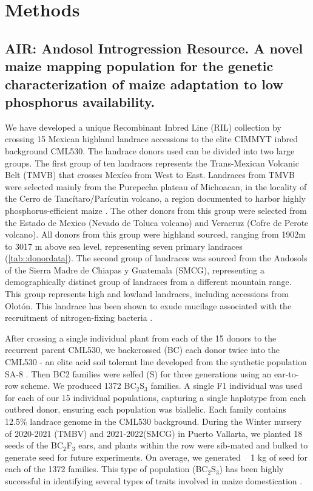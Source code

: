 \section{Methods}

\subsection{AIR: Andosol Introgression Resource. A novel maize mapping population for the genetic characterization of maize adaptation to low phosphorus availability.} 

We have developed a unique Recombinant Inbred Line (RIL) collection by crossing 15 Mexican highland landrace accessions to the elite CIMMYT inbred background CML530.
The landrace donors used can be divided into two large groups. 
The first group of ten landraces represents the Trans-Mexican Volcanic Belt (TMVB) that crosses Mexíco from West to East.
Landraces from TMVB were selected mainly from the Purepecha plateau of Michoacan, in the locality of the Cerro de Tancítaro/Parícutin volcano, a region documented to harbor highly phosphorus-efficient maize \citep{bayuelo-jimenez2011}. 
The other donors from this group were selected from the Estado de Mexico (Nevado de Toluca volcano) and Veracruz (Cofre de Perote volcano).
All donors from this group were highland sourced, ranging from 1902m to 3017 m above sea level, representing seven primary landraces (\autoref{tab::donordata}). 
The second group of landraces was sourced from the Andosols of the Sierra Madre de Chiapas y Guatemala (SMCG), representing a demographically distinct group of landraces from a different mountain range. This group represents high and lowland landraces, including accessions from Olotón.
This landrace has been shown to exude mucilage associated with the recruitment of nitrogen-fixing bacteria \citep{vandeynze2018}.

After crossing a single individual plant from each of the 15 donors to the recurrent parent CML530, we backcrossed (BC) each donor twice into the CML530  - an elite acid soil tolerant line developed from the synthetic population SA-8 \citep{granados1995} . Then BC2 families were selfed (S) for three generations using an ear-to-row scheme. We produced 1372 BC$_2$S$_3$ families.
A single F1 individual was used for each of our 15 individual populations, capturing a single haplotype from each outbred donor, ensuring each population was biallelic. Each family contains 12.5\% landrace genome in the CML530 background. During the Winter nursery of 2020-2021 (TMBV) and 2021-2022(SMCG) in Puerto Vallarta, we planted 18 seeds of the BC$_2$F$_3$ ears, and plants within the row were sib-mated and bulked to generate seed for future experiments.  On average, we generated ~ 1 kg of seed for each of the 1372 families. This type of population (BC$_2$S$_3$) has been highly successful in identifying several types of traits involved in maize domestication \citep{xu2017b,guo2018a,liang2019,tian2019}.


